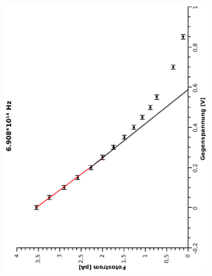 \documentclass{article}
\begin{document}
\begin{figure}
\begin{subfigure}{0.45\textwidth}
\includegraphics[width=\textwidth, angle=-90]{6908.eps}
\end{subfigure}
\begin{subfigure}{0.45\textwidth}

\end{subfigure}
\end{figure}
\end{document}
